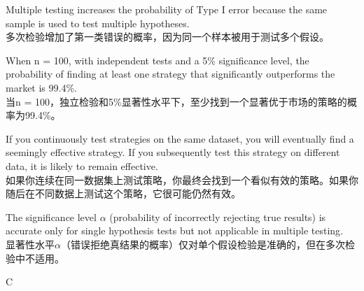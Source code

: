 \documentclass{article}
\begin{document}
\begin{choices}
    \item Multiple testing increases the probability of Type I error because the same sample is used to test multiple hypotheses.\\
    多次检验增加了第一类错误的概率，因为同一个样本被用于测试多个假设。
    \item When n = 100, with independent tests and a 5\% significance level, the probability of finding at least one strategy that significantly outperforms the market is 99.4\%.\\
    当n = 100，独立检验和5\%显著性水平下，至少找到一个显著优于市场的策略的概率为99.4\%。
    \item If you continuously test strategies on the same dataset, you will eventually find a seemingly effective strategy. If you subsequently test this strategy on different data, it is likely to remain effective.\\
    如果你连续在同一数据集上测试策略，你最终会找到一个看似有效的策略。如果你随后在不同数据上测试这个策略，它很可能仍然有效。
    \item The significance level \(\alpha\) (probability of incorrectly rejecting true results) is accurate only for single hypothesis tests but not applicable in multiple testing.\\
    显著性水平\(\alpha\)（错误拒绝真结果的概率）仅对单个假设检验是准确的，但在多次检验中不适用。
\end{choices}

\begin{correctanswer}
    C
\end{correctanswer}
\end{document}
